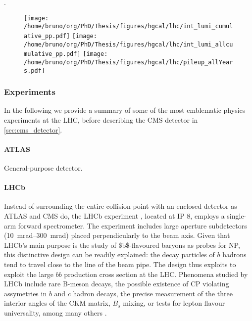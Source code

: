 \documentclass[11pt]{article}
\begin{document}
.
\begin{figure}
\texttt{[image: /home/bruno/org/PhD/Thesis/figures/hgcal/lhc/int\_lumi\_cumulative\_pp.pdf]}
\texttt{[image: /home/bruno/org/PhD/Thesis/figures/hgcal/lhc/int\_lumi\_allcumulative\_pp.pdf]}
\texttt{[image: /home/bruno/org/PhD/Thesis/figures/hgcal/lhc/pileup\_allYears.pdf]}
\end{figure}
\subsubsection{Experiments}
\label{sec:org86911df}
\label{sec:lhc_experiments}

In the following we provide a summary of some of the most emblematic physics experiments at the \ac{LHC}, before describing the \ac{CMS} detector in \cref{sec:cms_detector}.

\paragraph{ATLAS}
General-purpose detector. \cite{atlas_collab}

\paragraph{LHCb}

Instead of surrounding the entire collision point with an enclosed detector as \ac{ATLAS} and \ac{CMS} do, the \ac{LHCb} experiment \cite{lhcb_collab}, located at \ac{IP} 8, employs a single-arm forward spectrometer.
The experiment includes large aperture subdetectors (\SIrange{10}{300}{\milli\radian}) placed perpendicularly to the beam axis.
Given that \ac{LHCb}'s main purpose is the study of \$b\$-flavoured baryons as probes for \ac{NP}, this distinctive design can be readily explained: the decay particles of \(b\) hadrons tend to travel close to the line of the beam pipe.
The design thus exploits to exploit the large \(bb\) production cross section at the \ac{LHC}.
Phenomena studied by \ac{LHCb} include rare B-meson decays, the possible existence of \ac{CP} violating assymetries in \(b\) and \(c\) hadron decays, the precise measurement of the three interior angles of the \ac{CKM} matrix, \(B_{s}\) mixing, or tests for lepton flavour universality, among many others \cite{lhcb_hllhc_tdr}.
\end{document}

